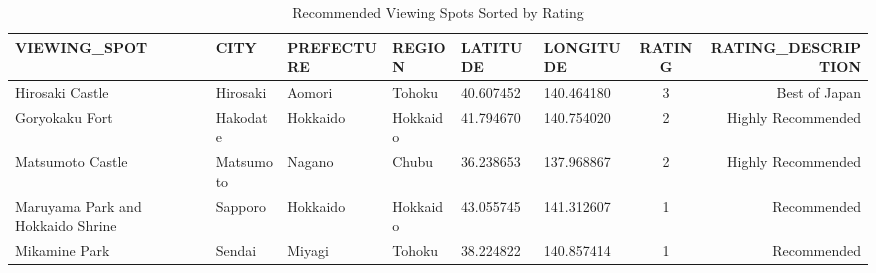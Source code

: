 
\begin{table}[h]
  \tiny
  \centering
  \caption{Recommended Viewing Spots Sorted by Rating}
  \begin{tabular}{llllllcr}
  \toprule
  VIEWING\_SPOT                     & CITY      & PREFECTURE & REGION   &  LATITUDE &  LONGITUDE & RATING  & RATING\_DESCRIPTION \\
  \midrule
                    Hirosaki Castle &  Hirosaki &   Aomori   &   Tohoku & 40.607452 & 140.464180 &  3      &      Best of Japan \\
                     Goryokaku Fort &  Hakodate & Hokkaido   & Hokkaido & 41.794670 & 140.754020 &  2      & Highly Recommended \\
                   Matsumoto Castle & Matsumoto &   Nagano   &    Chubu & 36.238653 & 137.968867 &  2      & Highly Recommended \\
  Maruyama Park and Hokkaido Shrine &   Sapporo & Hokkaido   & Hokkaido & 43.055745 & 141.312607 &  1      &        Recommended \\
                      Mikamine Park &    Sendai &   Miyagi   &   Tohoku & 38.224822 & 140.857414 &  1      &        Recommended \\
  \bottomrule
  \end{tabular}
  \end{table}
  